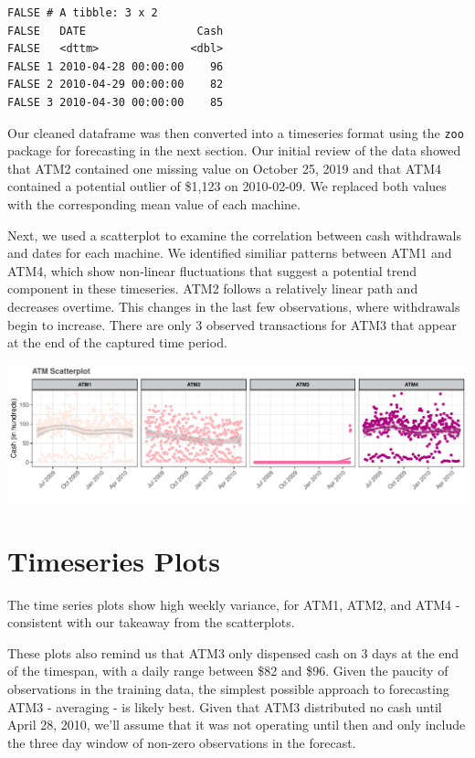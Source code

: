 \documentclass[openany]{book}
\begin{document}
\begin{verbatim}
FALSE # A tibble: 3 x 2
FALSE   DATE                 Cash
FALSE   <dttm>              <dbl>
FALSE 1 2010-04-28 00:00:00    96
FALSE 2 2010-04-29 00:00:00    82
FALSE 3 2010-04-30 00:00:00    85
\end{verbatim}

Our cleaned dataframe was then converted into a timeseries format using
the \texttt{zoo} package for forecasting in the next section. Our
initial review of the data showed that ATM2 contained one missing value
on October 25, 2019 and that ATM4 contained a potential outlier of
\$1,123 on 2010-02-09. We replaced both values with the corresponding
mean value of each machine.

Next, we used a scatterplot to examine the correlation between cash
withdrawals and dates for each machine. We identified similiar patterns
between ATM1 and ATM4, which show non-linear fluctuations that suggest a
potential trend component in these timeseries. ATM2 follows a relatively
linear path and decreases overtime. This changes in the last few
observations, where withdrawals begin to increase. There are only 3
observed transactions for ATM3 that appear at the end of the captured
time period.

\includegraphics{Part-A-JM_JO_files/figure-latex/unnamed-chunk-3-1.pdf}

\hypertarget{timeseries-plots}{%
\section{Timeseries Plots}\label{timeseries-plots}}

The time series plots show high weekly variance, for ATM1, ATM2, and
ATM4 - consistent with our takeaway from the scatterplots.

These plots also remind us that ATM3 only dispensed cash on 3 days at
the end of the timespan, with a daily range between \$82 and \$96. Given
the paucity of observations in the training data, the simplest possible
approach to forecasting ATM3 - averaging - is likely best. Given that
ATM3 distributed no cash until April 28, 2010, we'll assume that it was
not operating until then and only include the three day window of
non-zero observations in the forecast.
\end{document}
